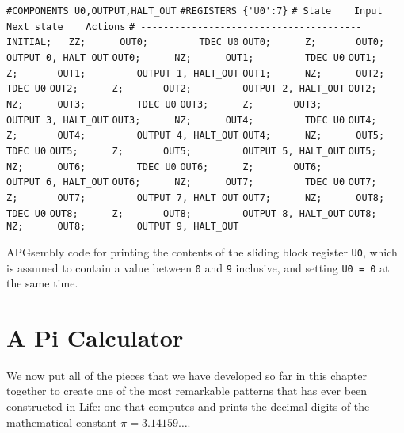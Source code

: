 \begin{apgsembly}
	\begin{algorithmic}\small
		\State \verb|#COMPONENTS U0,OUTPUT,HALT_OUT|
		\State \verb|#REGISTERS {'U0':7}|
		\State \verb|# State    Input    Next state    Actions|
		\State \verb|# ---------------------------------------|
		\State \verb|INITIAL;   ZZ;      OUT0;         TDEC U0|
		\State \verb|OUT0;      Z;       OUT0;         OUTPUT 0, HALT_OUT|
		\State \verb|OUT0;      NZ;      OUT1;         TDEC U0|
		\State \verb|OUT1;      Z;       OUT1;         OUTPUT 1, HALT_OUT|
		\State \verb|OUT1;      NZ;      OUT2;         TDEC U0|
		\State \verb|OUT2;      Z;       OUT2;         OUTPUT 2, HALT_OUT|
		\State \verb|OUT2;      NZ;      OUT3;         TDEC U0|
		\State \verb|OUT3;      Z;       OUT3;         OUTPUT 3, HALT_OUT|
		\State \verb|OUT3;      NZ;      OUT4;         TDEC U0|
		\State \verb|OUT4;      Z;       OUT4;         OUTPUT 4, HALT_OUT|
		\State \verb|OUT4;      NZ;      OUT5;         TDEC U0|
		\State \verb|OUT5;      Z;       OUT5;         OUTPUT 5, HALT_OUT|
		\State \verb|OUT5;      NZ;      OUT6;         TDEC U0|
		\State \verb|OUT6;      Z;       OUT6;         OUTPUT 6, HALT_OUT|
		\State \verb|OUT6;      NZ;      OUT7;         TDEC U0|
		\State \verb|OUT7;      Z;       OUT7;         OUTPUT 7, HALT_OUT|
		\State \verb|OUT7;      NZ;      OUT8;         TDEC U0|
		\State \verb|OUT8;      Z;       OUT8;         OUTPUT 8, HALT_OUT|
		\State \verb|OUT8;      NZ;      OUT8;         OUTPUT 9, HALT_OUT|
	\end{algorithmic}
	\caption{APGsembly code for printing the contents of the sliding block register \texttt{U0}, which is assumed to contain a value between \texttt{0} and \texttt{9} inclusive, and setting \texttt{U0 = 0} at the same time.}\label{alg:apgsembly_print_sbr}
\end{apgsembly}



\section{A Pi Calculator}\label{sec:pi_calc}

We now put all of the pieces that we have developed so far in this chapter together to create one of the most remarkable patterns that has ever been constructed in Life: one that computes and prints the decimal digits of the mathematical constant $\pi = 3.14159\ldots$.

